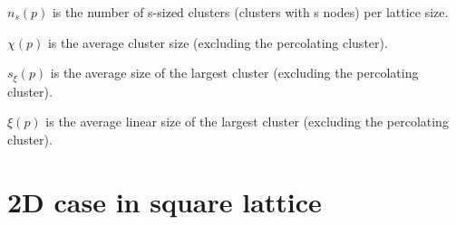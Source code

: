 \begin{defn}
	$n_{s}(p)$ is the number of s-sized clusters (clusters with s nodes) per lattice size.

\end{defn}

\begin{defn}
$\chi(p)$ is the average cluster size (excluding the percolating cluster).
\end{defn}

\begin{defn}
	$s_{\xi}(p)$ is the average size of the largest cluster (excluding the percolating cluster).
\end{defn}

\begin{defn}
$\xi(p)$ is the average linear size of the largest cluster (excluding the percolating cluster).
\end{defn}














\section{2D case in square lattice}\label{sec:2dsquare}


